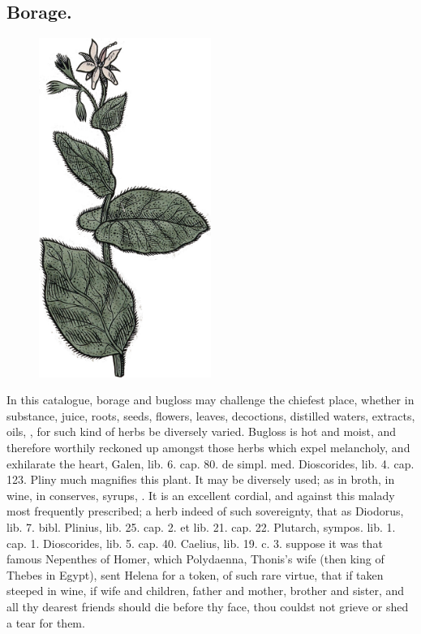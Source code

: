 {\subsection{Borage.}
\begin{figure}
  \begingroup
  \includegraphics[keepaspectratio,width=0.5\textwidth]{figures/buglossa-small.jpg}
  \label{fig:buglosa}
\end{figure}
In this catalogue, borage and bugloss may challenge the
chiefest place, whether in substance, juice, roots, seeds, flowers,
leaves, decoctions, distilled waters, extracts, oils, \etc{}, for such
kind of herbs be diversely varied. Bugloss is hot and moist, and
therefore worthily reckoned up amongst those herbs which expel
melancholy, and  exhilarate the heart, Galen, lib. 6. cap. 80. de
simpl. med. Dioscorides, lib. 4. cap. 123. Pliny much magnifies this
plant. It may be diversely used; as in broth, in wine, in
conserves, syrups, \etc{}. It is an excellent cordial, and against this
malady most frequently prescribed; a herb indeed of such sovereignty,
that as Diodorus, lib. 7. bibl. Plinius, lib. 25. cap. 2. et lib. 21.
cap. 22. Plutarch, sympos. lib. 1. cap. 1. Dioscorides, lib. 5. cap.
40. Caelius, lib. 19. c. 3. suppose it was that famous Nepenthes of
Homer, which Polydaenna, Thonis's wife (then king of Thebes in
Egypt), sent Helena for a token, of such rare virtue, that if taken
steeped in wine, if wife and children, father and mother, brother and
sister, and all thy dearest friends should die before thy face, thou
couldst not grieve or shed a tear for them.

}
